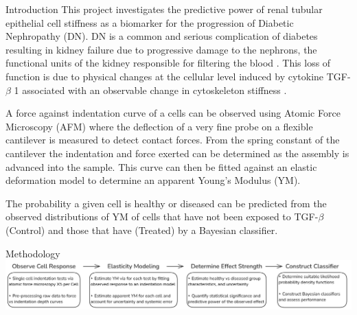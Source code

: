 \documentclass[a0paper,portrait]{baposter}
\begin{document}
\begin{poster}
\begin{posterbox}[name=intro,span=2,column=1,row=0]{Introduction}
This project investigates the predictive power of renal tubular epithelial cell stiffness as a biomarker for the progression of Diabetic Nephropathy (DN). 
DN is a common and serious complication of diabetes resulting in kidney failure due to progressive damage to the nephrons, the functional units of the kidney responsible for filtering the blood \cite{metcalfeW2007-HowDoesEarlyChronicKidneyDiseaseProgress}.
This loss of function is due to physical changes at the cellular level induced by cytokine TGF-$\beta$ 1 associated with an observable change in cytoskeleton stiffness \cite{hillsCE2012-TGFvModulatesCelltocell}. 

\begin{minipage}[t]{0.775\linewidth}
  \vspace{0pt}
  A force against indentation curve of a cells can be observed using Atomic Force Microscopy (AFM) where the deflection of a very fine probe on a flexible cantilever is measured to detect contact forces. 
  From the spring constant of the cantilever the indentation and force exerted can be determined as the assembly is advanced into the sample. 
  This curve can then be fitted against an elastic deformation model to determine an apparent Young's Modulus (YM). 
\end{minipage}
\hfill
\begin{minipage}[t]{0.2\linewidth}
  \vspace{-10pt}
  \centering
  
\end{minipage}
\vspace{1em}

The probability a given cell is healthy or diseased can be predicted from the observed distributions of YM of cells that have not been exposed to TGF-$\beta$ (Control) and those that have (Treated) by a Bayesian classifier.

\end{posterbox}


\begin{posterbox}[name=method,span=2,column=1,below=intro]{Methodology}
\includegraphics[width=\linewidth]{images/Methodology Summary Blocks.png}


\end{posterbox}
\end{poster}
\end{document}
